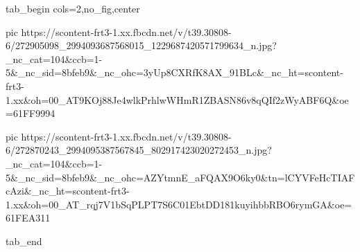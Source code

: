  
 
 
 
 


\ifcmt
  tab_begin cols=2,no_fig,center

     pic https://scontent-frt3-1.xx.fbcdn.net/v/t39.30808-6/272905098_2994093687568015_1229687420571799634_n.jpg?_nc_cat=104&ccb=1-5&_nc_sid=8bfeb9&_nc_ohc=3yUp8CXRfK8AX_91BLc&_nc_ht=scontent-frt3-1.xx&oh=00_AT9KOj88Je4wlkPrhlwWHmR1ZBASN86v8qQIf2zWyABF6Q&oe=61FF9994

     pic https://scontent-frt3-1.xx.fbcdn.net/v/t39.30808-6/272870243_2994095387567845_802917423020272453_n.jpg?_nc_cat=104&ccb=1-5&_nc_sid=8bfeb9&_nc_ohc=AZYtmnE_aFQAX9O6ky0&tn=lCYVFeHcTIAFcAzi&_nc_ht=scontent-frt3-1.xx&oh=00_AT_rqj7V1bSqPLPT7S6C01EbtDD181kuyihbbRBO6rymGA&oe=61FEA311

  tab_end
\fi
